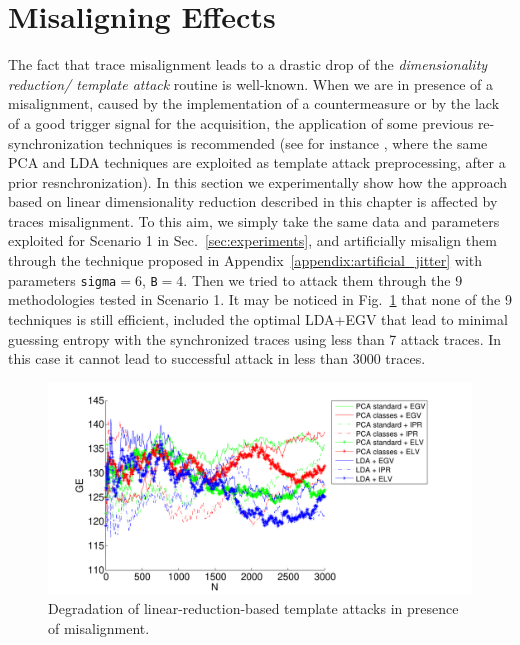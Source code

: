 \section{Misaligning Effects}\label{sec:misalignment}
The fact that trace misalignment leads to a drastic drop of the \emph{dimensionality reduction/ template attack} routine is well-known. When we are in presence of a misalignment, caused by the implementation of a countermeasure or  by the lack of a good trigger signal for the acquisition, the application of some previous re-synchronization techniques is recommended (see for instance \cite{choudary2014template}, where the same PCA and LDA techniques are exploited as template attack preprocessing, after a prior resnchronization). In this section we experimentally show how the approach based on linear dimensionality reduction described in this chapter is affected by traces misalignment. To this aim, we simply take the same data and parameters exploited for Scenario 1 in Sec.~\ref{sec:experiments}, and artificially misalign them through the technique proposed in Appendix~\ref{appendix:artificial_jitter} with parameters \texttt{sigma}$= 6$, \texttt{B}$= 4$. Then we tried to attack them through the 9 methodologies tested in Scenario 1. It may be noticed in Fig.~\ref{fig:PCA_LDA_misalignment} that none of the 9 techniques is still efficient, included the optimal LDA+EGV that lead to minimal guessing entropy with the synchronized traces using less than 7 attack traces. In this case it cannot lead to successful attack in less than 3000 traces.
\begin{figure}
\includegraphics[width=\textwidth]{../Figures/desynchro_results_PCA_LDA.pdf} 
\caption{Degradation of linear-reduction-based template attacks in presence of misalignment.}\label{fig:PCA_LDA_misalignment}
\end{figure}